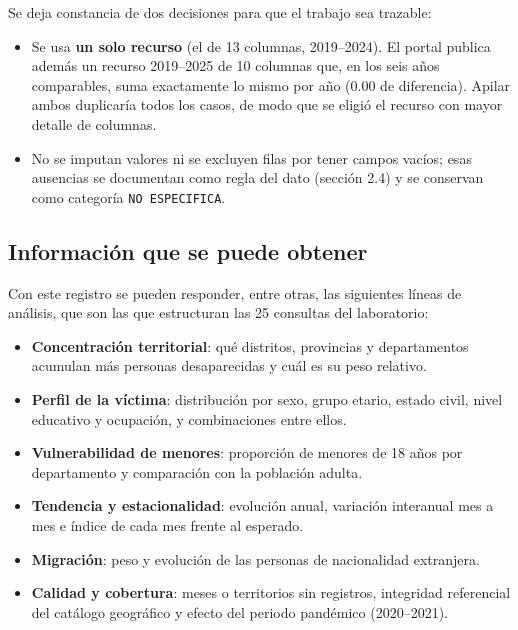 Se deja constancia de dos decisiones para que el trabajo sea trazable:
\begin{itemize}
  \item Se usa \textbf{un solo recurso} (el de 13 columnas, 2019--2024). El portal publica
        adem\'as un recurso 2019--2025 de 10 columnas que, en los seis a\~nos comparables, suma
        exactamente lo mismo por a\~no (0.00 de diferencia). Apilar ambos duplicar\'ia todos los
        casos, de modo que se eligi\'o el recurso con mayor detalle de columnas.
  \item No se imputan valores ni se excluyen filas por tener campos vac\'ios; esas ausencias se
        documentan como regla del dato (secci\'on 2.4) y se conservan como categor\'ia
        \texttt{NO ESPECIFICA}.
\end{itemize}

\subsection{Informaci\'on que se puede obtener}
Con este registro se pueden responder, entre otras, las siguientes l\'ineas de an\'alisis, que
son las que estructuran las 25 consultas del laboratorio:
\begin{itemize}
  \item \textbf{Concentraci\'on territorial}: qu\'e distritos, provincias y departamentos acumulan
        m\'as personas desaparecidas y cu\'al es su peso relativo.
  \item \textbf{Perfil de la v\'ictima}: distribuci\'on por sexo, grupo etario, estado civil,
        nivel educativo y ocupaci\'on, y combinaciones entre ellos.
  \item \textbf{Vulnerabilidad de menores}: proporci\'on de menores de 18 a\~nos por departamento
        y comparaci\'on con la poblaci\'on adulta.
  \item \textbf{Tendencia y estacionalidad}: evoluci\'on anual, variaci\'on interanual mes a mes e
        \'indice de cada mes frente al esperado.
  \item \textbf{Migraci\'on}: peso y evoluci\'on de las personas de nacionalidad extranjera.
  \item \textbf{Calidad y cobertura}: meses o territorios sin registros, integridad referencial
        del cat\'alogo geogr\'afico y efecto del periodo pand\'emico (2020--2021).
\end{itemize}
